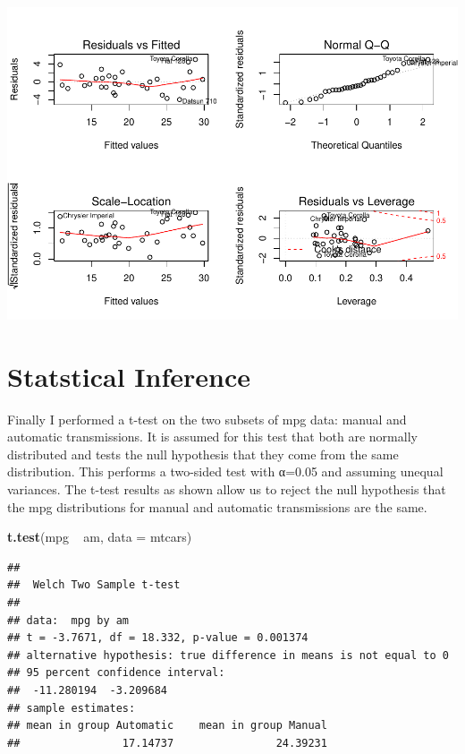 \documentclass[]{article}
\newenvironment{Shaded}{\begin{snugshade}}{\end{snugshade}}
\newcommand{\KeywordTok}[1]{\textcolor[rgb]{0.13,0.29,0.53}{\textbf{{#1}}}}
\newcommand{\DataTypeTok}[1]{\textcolor[rgb]{0.13,0.29,0.53}{{#1}}}
\newcommand{\StringTok}[1]{\textcolor[rgb]{0.31,0.60,0.02}{{#1}}}
\newcommand{\NormalTok}[1]{{#1}}
\begin{document}
\includegraphics{regression_models_report_files/figure-latex/unnamed-chunk-7-1.pdf}

\section{Statstical Inference}\label{statstical-inference}

Finally I performed a t-test on the two subsets of mpg data: manual and
automatic transmissions. It is assumed for this test that both are
normally distributed and tests the null hypothesis that they come from
the same distribution. This performs a two-sided test with α=0.05 and
assuming unequal variances. The t-test results as shown allow us to
reject the null hypothesis that the mpg distributions for manual and
automatic transmissions are the same.

\begin{Shaded}
\begin{Highlighting}[]
\KeywordTok{t.test}\NormalTok{(mpg ~}\StringTok{ }\NormalTok{am, }\DataTypeTok{data =} \NormalTok{mtcars)}
\end{Highlighting}
\end{Shaded}

\begin{verbatim}
## 
##  Welch Two Sample t-test
## 
## data:  mpg by am
## t = -3.7671, df = 18.332, p-value = 0.001374
## alternative hypothesis: true difference in means is not equal to 0
## 95 percent confidence interval:
##  -11.280194  -3.209684
## sample estimates:
## mean in group Automatic    mean in group Manual 
##                17.14737                24.39231
\end{verbatim}
\end{document}
